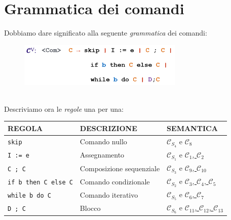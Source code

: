 \documentclass[a4paper,oneside,titlepage]{book}
\begin{document}
\section{Grammatica dei comandi}
Dobbiamo dare significato alla seguente \textit{grammatica} dei comandi:
\begin{figure}[htp]
	\centering
	\includegraphics[width=0.7\textwidth]{com.png}
\end{figure}
\\
Descriviamo ora le \textit{regole} una per una:
\begin{center}
	\begin{tabular}{lll}
		\toprule
		\textbf{REGOLA} & \textbf{DESCRIZIONE} & \textbf{SEMANTICA} \\
		
		\midrule
		\lstinline|skip| & Comando nullo & \hyperref[sec:comSemStat]{$\mathcal{C}_{S_4}$} e \hyperref[sec:comSemDin]{$\mathcal{C}_8$} \\
		
		\midrule
		\lstinline|I := e| & Assegnamento & \hyperref[sec:comSemStat]{$\mathcal{C}_{S_1}$} e \hyperref[sec:comSemDin]{$\mathcal{C}_1$, $\mathcal{C}_2$} \\
		
		\midrule
		\lstinline|C ; C| & Composizione sequenziale & \hyperref[sec:comSemStat]{$\mathcal{C}_{S_3}$} e \hyperref[sec:comSemDin]{$\mathcal{C}_9$, $\mathcal{C}_{10}$} \\
		
		\midrule
		\lstinline|if b then C else C| & Comando condizionale & \hyperref[sec:comSemStat]{$\mathcal{C}_{S_2}$} e \hyperref[sec:comSemDin]{$\mathcal{C}_3$, $\mathcal{C}_4$, $\mathcal{C}_5$} \\
		
		\midrule
		\lstinline|while b do C| & Comando iterativo & \hyperref[sec:comSemStat]{$\mathcal{C}_{S_5}$} e \hyperref[sec:comSemDin]{$\mathcal{C}_6$, $\mathcal{C}_7$} \\
		
		\midrule
		\lstinline|D ; C| & Blocco & \hyperref[sec:comSemStat]{$\mathcal{C}_{S_6}$} e \hyperref[sec:comSemDin]{$\mathcal{C}_{11}$, $\mathcal{C}_{12}$, $\mathcal{C}_{13}$} \\
	
		\bottomrule
	\end{tabular}
\end{center}
\end{document}

